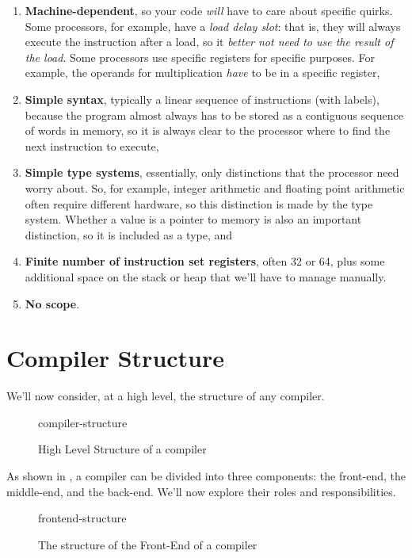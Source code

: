 \begin{enumerate}
    \item \textbf{Machine-dependent}, so your code \emph{will} have to care about specific quirks. Some processors, for example, have a \emph{load delay slot}: that is, they will always execute the instruction after a load, so it \emph{better not need to use the result of the load}. Some processors use specific registers for specific purposes. For example, the operands for multiplication \emph{have} to be in a specific register,
    \item \textbf{Simple syntax}, typically a linear sequence of instructions (with labels), because the program almost always has to be stored as a contiguous sequence of words in memory, so it is always clear to the processor where to find the next instruction to execute,
    \item \textbf{Simple type systems}, essentially, only distinctions that the processor need worry about. So, for example, integer arithmetic and floating point arithmetic often require different hardware, so this distinction is made by the type system. Whether a value is a pointer to memory is also an important distinction, so it is included as a type, and 
    \item \textbf{Finite number of instruction set registers}, often 32 or 64, plus some additional space on the stack or heap that we'll have to manage manually.
    \item \textbf{No scope}.
\end{enumerate}

\section{Compiler Structure}
We'll now consider, at a high level, the structure of any compiler. 

\begin{figure}[h]
    \centering
    {compiler-structure}
    \caption{High Level Structure of a compiler}
    \label{fig:compiler-structure}
\end{figure}

As shown in , a compiler can be divided into three components: the front-end, the middle-end, and the back-end. We'll now explore their roles and responsibilities. 

\begin{figure}[h]
    \centering
    {frontend-structure}
    \caption{The structure of the Front-End of a compiler}
    \label{fig:frontend-label}
\end{figure}

